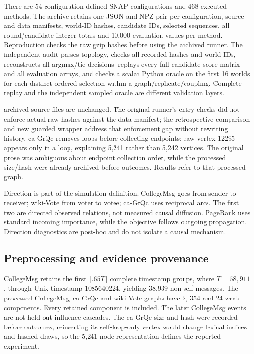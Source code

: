 \documentclass[smallextended]{svjour3}
\begin{document}
There are 54 configuration-defined SNAP configurations and 468 executed methods.
The archive retains one JSON and NPZ pair per configuration, source and data manifests,
world-ID hashes, candidate IDs, selected sequences, all round/candidate integer
totals and 10,000 evaluation values per method. Reproduction checks the raw gzip
hashes before using the archived runner. The independent audit
parses topology, checks all recorded hashes and world IDs, reconstructs all
argmax/tie decisions, replays every full-candidate score matrix and all evaluation
arrays, and checks a scalar Python oracle on the first 16 worlds for each
distinct ordered selection within a graph/replicate/coupling. Complete replay and the
independent sampled oracle are different validation layers.

archived source files are unchanged. The original runner's entry checks did not
enforce actual raw hashes against the data manifest; the retrospective comparison
and new guarded wrapper address that enforcement gap without rewriting history.
ca-GrQc removes loops before collecting endpoints: raw vertex 12295 appears only
in a loop, explaining 5,241 rather than 5,242 vertices. The original prose was
ambiguous about endpoint collection order, while the processed size/hash were
already archived before outcomes. Results refer to that processed graph.

Direction is part of the simulation definition. CollegeMsg goes from sender to
receiver; wiki-Vote from voter to votee; ca-GrQc uses reciprocal arcs. The first
two are directed observed relations, not measured causal diffusion. PageRank uses
standard incoming importance, while the objective follows outgoing propagation.
Direction diagnostics are post-hoc and do not isolate a causal mechanism.

\subsection{Preprocessing and evidence provenance}
CollegeMsg retains the first $\lfloor .65T\rfloor$ complete timestamp groups,
where $T=58,911$, through Unix timestamp 1085640224, yielding 38,939 non-self
messages. The processed CollegeMsg, ca-GrQc and wiki-Vote graphs have 2, 354 and
24 weak components. Every retained component is included. The later CollegeMsg
events are not held-out influence cascades. The ca-GrQc size and hash were
recorded before outcomes; reinserting its self-loop-only vertex would change
lexical indices and hashed draws, so the 5,241-node representation defines the
reported experiment.
\end{document}
